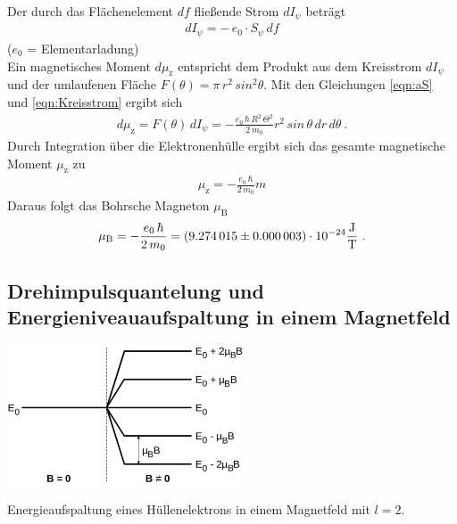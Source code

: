 Der durch das Flächenelement $df$ fließende Strom $dI_\psi$ beträgt
\begin{align}\label{eqn:Kreisstrom} %
	dI_\psi = -\,e_0\cdot S_\psi\,df
\end{align}
\hfill {\footnotesize($e_0$ = Elementarladung)} \hfill \vspace{0.25cm}\\
Ein magnetisches Moment $d\mu_\text{z}$ entspricht dem Produkt aus dem Kreisstrom $dI_\psi$ und der umlaufenen Fläche $F(\theta) = \pi\, r^2\, sin^2\theta$. Mit den Gleichungen \eqref{eqn:aS} und \eqref{eqn:Kreisstrom} ergibt sich
\begin{align}\label{eqn:mM} %
	d\mu_\text{z} = F(\theta)\, dI_\psi = - \frac{e_0\, \hbar\, R^2\, \Theta^2}{2\, m_0} r^2\, sin\,\theta\, dr\, d\theta \ .
\end{align}
Durch Integration über die Elektronenhülle ergibt sich das gesamte magnetische Moment $\mu_\text{z}$ zu
\begin{align}\label{eqn:gmM} %
	\mu_\text{z} = - \frac{e_0\, \hbar}{2\, m_0} m
\end{align}
Daraus folgt das Bohrsche Magneton $\mu_\text{B}$ \cite{V28}
\begin{align}\label{eqn:BM} %
	\mu_\text{B} = - \frac{e_0\, \hbar}{2\, m_0} = (\num{9.274015 +- 0.000003})\cdot 10^{-24} \frac{\text{J}}{\text{T}} \ .
\end{align}



\subsection{Drehimpulsquantelung und Energieniveauaufspaltung in einem Magnetfeld}

\begin{floatingfigure}{7cm}
	\includegraphics[width=7cm]{picture/Energiequantelung.pdf}
  \caption{Energieaufspaltung eines Hüllenelektrons in einem Magnetfeld mit $l = 2$. \cite{V28}}
	\label{fig:Energiequantelung}
\end{floatingfigure}

